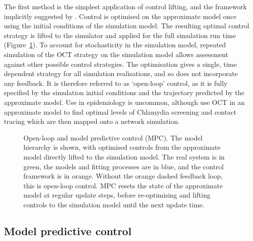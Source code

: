 The first method is the simplest application of control lifting, and the framework implicitly suggested by \citet{an_optimization_2017}. Control is optimised on the approximate model once using the initial conditions of the simulation model. The resulting optimal control strategy is lifted to the simulator and applied for the full simulation run time (Figure~\ref{fig:ch4:mpc_framework}). To account for stochasticity in the simulation model, repeated simulation of the OCT strategy on the simulation model allows assessment against other possible control strategies. The optimisation gives a single, time dependent strategy for all simulation realisations, and so does not incorporate any feedback. It is therefore referred to as `open-loop' control, as it is fully specified by the simulation initial conditions and the trajectory predicted by the approximate model. Use in epidemiology is uncommon, although \citet{clarke_approximating_2013} use OCT in an approximate model to find optimal levels of Chlamydia screening and contact tracing which are then mapped onto a network simulation.

\begin{figure}[htb]
    \begin{center}
        \hspace{0em}

        \caption{Open-loop and model predictive control (MPC). The model hierarchy is shown, with optimised controls from the approximate model directly lifted to the simulation model. The real system is in green, the models and fitting processes are in blue, and the control framework is in orange. Without the orange dashed feedback loop, this is open-loop control. MPC resets the state of the approximate model at regular update steps, before re-optimising and lifting controls to the simulation model until the next update time. }
        \label{fig:ch4:mpc_framework}
    \end{center}
\end{figure}

\subsection{Model predictive control}

